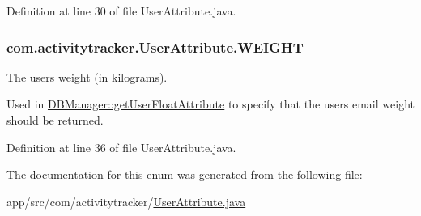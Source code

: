 Definition at line 30 of file User\+Attribute.\+java.

\subsubsection[{\texorpdfstring{W\+E\+I\+G\+HT}{WEIGHT}}]{\setlength{\rightskip}{0pt plus 5cm}com.\+activitytracker.\+User\+Attribute.\+W\+E\+I\+G\+HT}\hypertarget{enumcom_1_1activitytracker_1_1_user_attribute_a024206b0dc3261031ef586b3f0fd530c}{}\label{enumcom_1_1activitytracker_1_1_user_attribute_a024206b0dc3261031ef586b3f0fd530c}
The user\textquotesingle{}s weight (in kilograms).

Used in \hyperlink{classcom_1_1activitytracker_1_1_d_b_manager_a98df66254bec4d74b29cfe468a9fc794}{D\+B\+Manager\+::get\+User\+Float\+Attribute} to specify that the user\textquotesingle{}s email weight should be returned. 

Definition at line 36 of file User\+Attribute.\+java.



The documentation for this enum was generated from the following file\+:\begin{DoxyCompactItemize}
\item 
app/src/com/activitytracker/\hyperlink{_user_attribute_8java}{User\+Attribute.\+java}\end{DoxyCompactItemize}

